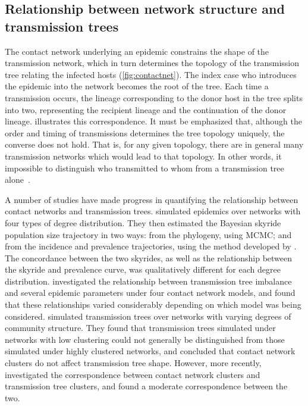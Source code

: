 \subsection{Relationship between network structure and transmission trees}

The contact network underlying an epidemic constrains the shape of the
transmission network, which in turn determines the topology of the transmission
tree relating the infected hosts (\cref{fig:contactnet}). The index case who
introduces the epidemic into the network becomes the root of the tree. Each
time a transmission occurs, the lineage corresponding to the donor host in the
tree splits into two, representing the recipient lineage and the continuation
of the donor lineage.  illustrates this correspondence.
It must be emphasized that, although the order and timing of transmissions
determines the tree topology uniquely, the converse does not hold. That is, for
any given topology, there are in general many transmission networks which would
lead to that topology. In other words, it impossible to distinguish who
transmitted to whom from a transmission tree alone~\autocite{bernard2007hiv}.

A number of studies have made progress in quantifying the relationship between
contact networks and transmission trees. \textcite{o2010contact} simulated
epidemics over networks with four types of degree distribution. They then
estimated the Bayesian skyride~\autocite{minin2008smooth} population size
trajectory in two ways: from the phylogeny, using \gls{MCMC}; and from the
incidence and prevalence trajectories, using the method developed by
\textcite{volz2009phylodynamics}. The concordance between the two skyrides, as
well as the relationship between the skyride and prevalence curve, was
qualitatively different for each degree distribution.
\textcite{leventhal2012inferring} investigated the relationship between
transmission tree imbalance and several epidemic parameters under four contact
network models, and found that these relationships varied considerably
depending on which model was being considered. \textcite{welch2011network}
simulated transmission trees over networks with varying degrees of community
structure. They found that transmission trees simulated under networks with low
clustering could not generally be distinguished from those simulated under
highly clustered networks, and concluded that contact network clusters do not
affect transmission tree shape. However, more recently,
\textcite{villandre2016assessment} investigated the correspondence between
contact network clusters and transmission tree clusters, and found a moderate
correspondence between the two.

